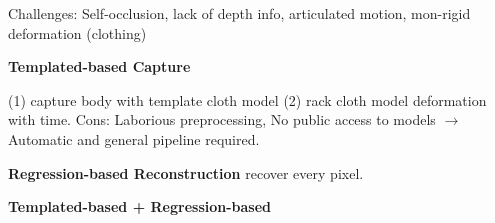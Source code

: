 Challenges: Self-occlusion, lack of depth info, articulated motion,  mon-rigid deformation (clothing)

\textbf{Templated-based Capture}

(1) capture body with template cloth model  (2) rack cloth model deformation with time. Cons: Laborious preprocessing, No public access to models \(\to\) Automatic and general pipeline required.

\textbf{Regression-based Reconstruction} recover every pixel.

\textbf{Templated-based + Regression-based}
